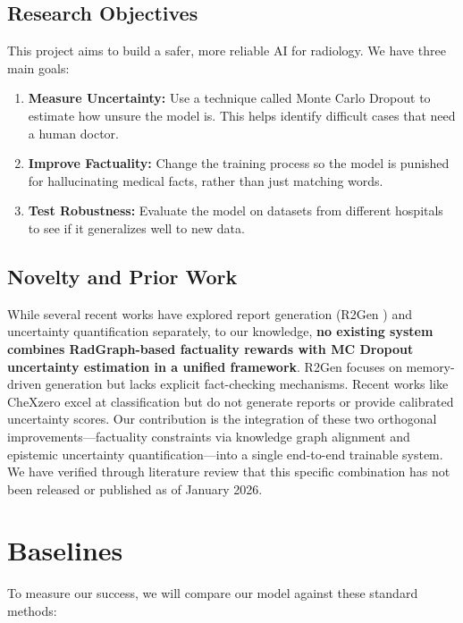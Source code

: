 \documentclass[11pt,a4paper]{article}
\begin{document}
\subsection{Research Objectives}
This project aims to build a safer, more reliable AI for radiology. We have three main goals:
\begin{enumerate}
    \item \textbf{Measure Uncertainty:} Use a technique called Monte Carlo Dropout to estimate how unsure the model is. This helps identify difficult cases that need a human doctor.
    \item \textbf{Improve Factuality:} Change the training process so the model is punished for hallucinating medical facts, rather than just matching words.
    \item \textbf{Test Robustness:} Evaluate the model on datasets from different hospitals to see if it generalizes well to new data.
\end{enumerate}

\subsection{Novelty and Prior Work}
While several recent works have explored report generation (R2Gen \cite{chen2020r2gen}) and uncertainty quantification separately, to our knowledge, \textbf{no existing system combines RadGraph-based factuality rewards with MC Dropout uncertainty estimation in a unified framework}. R2Gen focuses on memory-driven generation but lacks explicit fact-checking mechanisms. Recent works like CheXzero \cite{tiu2022chexzero} excel at classification but do not generate reports or provide calibrated uncertainty scores. Our contribution is the integration of these two orthogonal improvements—factuality constraints via knowledge graph alignment and epistemic uncertainty quantification—into a single end-to-end trainable system. We have verified through literature review that this specific combination has not been released or published as of January 2026.

\section{Baselines}
To measure our success, we will compare our model against these standard methods:
\end{document}
